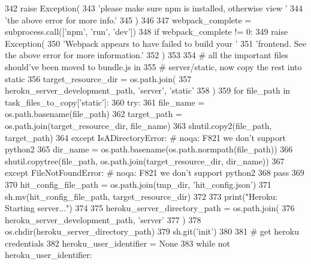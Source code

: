 \begin{DoxyCode}
342         \textcolor{keywordflow}{raise} Exception(
343             \textcolor{stringliteral}{'please make sure npm is installed, otherwise view '}
344             \textcolor{stringliteral}{'the above error for more info.'}
345         )
346 
347     webpack\_complete = subprocess.call([\textcolor{stringliteral}{'npm'}, \textcolor{stringliteral}{'run'}, \textcolor{stringliteral}{'dev'}])
348     \textcolor{keywordflow}{if} webpack\_complete != 0:
349         \textcolor{keywordflow}{raise} Exception(
350             \textcolor{stringliteral}{'Webpack appears to have failed to build your '}
351             \textcolor{stringliteral}{'frontend. See the above error for more information.'}
352         )
353 
354     \textcolor{comment}{# all the important files should've been moved to bundle.js in}
355     \textcolor{comment}{# server/static, now copy the rest into static}
356     target\_resource\_dir = os.path.join(
357         heroku\_server\_development\_path, \textcolor{stringliteral}{'server'}, \textcolor{stringliteral}{'static'}
358     )
359     \textcolor{keywordflow}{for} file\_path \textcolor{keywordflow}{in} task\_files\_to\_copy[\textcolor{stringliteral}{'static'}]:
360         \textcolor{keywordflow}{try}:
361             file\_name = os.path.basename(file\_path)
362             target\_path = os.path.join(target\_resource\_dir, file\_name)
363             shutil.copy2(file\_path, target\_path)
364         \textcolor{keywordflow}{except} IsADirectoryError:  \textcolor{comment}{# noqa: F821 we don't support python2}
365             dir\_name = os.path.basename(os.path.normpath(file\_path))
366             shutil.copytree(file\_path, os.path.join(target\_resource\_dir, dir\_name))
367         \textcolor{keywordflow}{except} FileNotFoundError:  \textcolor{comment}{# noqa: F821 we don't support python2}
368             \textcolor{keywordflow}{pass}
369 
370     hit\_config\_file\_path = os.path.join(tmp\_dir, \textcolor{stringliteral}{'hit\_config.json'})
371     sh.mv(hit\_config\_file\_path, target\_resource\_dir)
372 
373     print(\textcolor{stringliteral}{"Heroku: Starting server..."})
374 
375     heroku\_server\_directory\_path = os.path.join(
376         heroku\_server\_development\_path, \textcolor{stringliteral}{'server'}
377     )
378     os.chdir(heroku\_server\_directory\_path)
379     sh.git(\textcolor{stringliteral}{'init'})
380 
381     \textcolor{comment}{# get heroku credentials}
382     heroku\_user\_identifier = \textcolor{keywordtype}{None}
383     \textcolor{keywordflow}{while} \textcolor{keywordflow}{not} heroku\_user\_identifier:

\end{DoxyCode}
